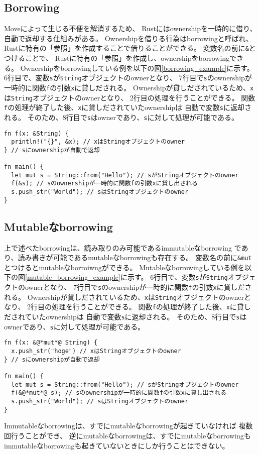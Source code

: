 \documentclass{sumiilab-paper}
\theoremstyle{mystyle}
\numberwithin{definition}{chapter} %
\begin{document}
\subsection{Borrowing}
Moveによって生じる不便を解消するため、
Rustにはownershipを一時的に借り、自動で返却する仕組みがある。
Ownershipを借りる行為はborrowingと呼ばれ、
Rustに特有の「参照」を作成することで借りることができる。
変数名の前に\texttt{\&}とつけることで、
Rustに特有の「参照」を作成し、ownershipをborrowingできる。
Ownershipをborrowingしている例を以下の図\ref{borrowing_example}に示す。
6行目で、変数\texttt{s}が\texttt{String}オブジェクトのownerとなり、
7行目で\texttt{s}のownershipが一時的に関数\texttt{f}の引数\texttt{x}に貸しだされる。
Ownershipが貸しだされているため、\texttt{x}は\texttt{String}オブジェクトのownerとなり、
2行目の処理を行うことができる。
関数\texttt{f}の処理が終了した後、\texttt{x}に貸しだされていたownershipは
自動で変数\texttt{s}に返却される。
そのため、8行目で\texttt{s}はownerであり、\texttt{s}に対して処理が可能である。

\begin{lstlisting}[caption=Borrowingの例, label=borrowing_example, captionpos=b]
fn f(x: &String) {
  println!("{}", &x); // xはStringオブジェクトのowner
} // sにownershipが自動で返却

fn main() {
  let mut s = String::from("Hello"); // sがStringオブジェクトのowner
  f(&s); // sのownershipが一時的に関数fの引数xに貸し出される
  s.push_str("World"); // sはStringオブジェクトのowner
}
\end{lstlisting}

\subsection{Mutableなborrowing}
上で述べたborrowingは、読み取りのみ可能であるimmutableなborrowing
であり、読み書きが可能であるmutableなborrowingも存在する。
変数名の前に\texttt{\&mut}とつけるとmutableなborroiwngができる。
Mutableなborrowingしている例を以下の図\ref{mutable_borrowing_example}に示す。
6行目で、変数\texttt{s}が\texttt{String}オブジェクトのownerとなり、
7行目で\texttt{s}のownershipが一時的に関数\texttt{f}の引数\texttt{x}に貸しだされる。
Ownershipが貸しだされているため、\texttt{x}は\texttt{String}オブジェクトのownerとなり、
2行目の処理を行うことができる。
関数\texttt{f}の処理が終了した後、\texttt{x}に貸しだされていたownershipは
自動で変数\texttt{s}に返却される。
そのため、8行目で\texttt{s}はownerであり、\texttt{s}に対して処理が可能である。

\begin{lstlisting}[caption=Mutableなborrowingの例, label=mutable_borrowing_example, captionpos=b]
fn f(x: &@*mut*@ String) {
  x.push_str("hoge") // xはStringオブジェクトのowner
} // sにownershipが自動で返却

fn main() {
  let mut s = String::from("Hello"); // sがStringオブジェクトのowner
  f(&@*mut*@ s); // sのownershipが一時的に関数fの引数xに貸し出される
  s.push_str("World"); // sはStringオブジェクトのowner
}
\end{lstlisting}
Immutableなborrowingは、すでにmutableなborrowingが起きていなければ
複数回行うことができ、
逆にmutableなborrowingは、すでにmutableなborrowingも
immutableなborrowingも起きていないときにしか行うことはできない。
\end{document}
